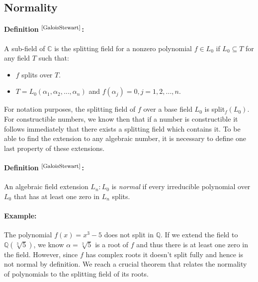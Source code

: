 \documentclass{article}
\begin{document}
\subsection{Normality}
\paragraph{Definition $^{\textrm{\footnotesize\cite{GaloisStewart}}}$:} A sub-field of $\mathbb{C}$ is the splitting field for a nonzero polynomial $f\in L_0$ if $L_0\subseteq T$ for any field $T$ such that:
\begin{itemize}
    \item[\textbf{(1)}] $f$ splits over $T$.
    \item[\textbf{(2)}] $T=L_0(\alpha_1,\alpha_2, ... ,\alpha_n)$ and $f(\alpha_j)=0, j=1,2,...,n.$
\end{itemize}
\par
For notation purposes, the splitting field of $f$ over a base field $L_0$ is split$_f(L_0)$. For constructible numbers, we know then that if a number is constructible it follows immediately that there exists a splitting field which contains it. To be able to find the extension to any algebraic number, it is necessary to define one last property of these extensions.

\paragraph{Definition $^{\textrm{\footnotesize\cite{GaloisStewart}}}$:} An algebraic field extension $L_n : L_0$ is \textit{normal} if every irreducible polynomial over $L_0$ that has at least one zero in $L_n$ splits.

\paragraph{Example:} The polynomial $f(x)=x^3-5$ does not split in $\mathbb{Q}$. If we extend the field to $\mathbb{Q}(\sqrt[3]{5})$, we know $\alpha=\sqrt[3]{5}$ is a root of $f$ and thus there is at least one zero in the field. However, since $f$ has complex roots it doesn't split fully and hence is not normal by definition.
 We reach a crucial theorem that relates the normality of polynomials to the splitting field of its roots.
\end{document}
